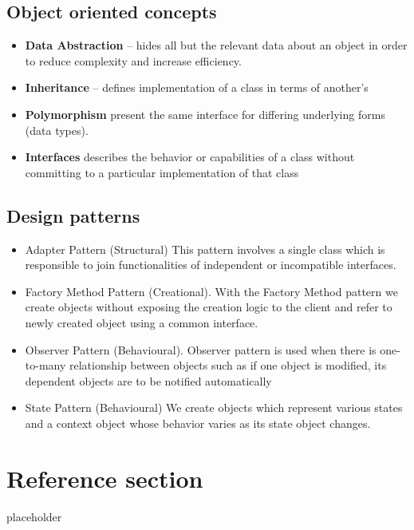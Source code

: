 \documentclass{article}
\begin{document}
\subsection{Object oriented concepts}
\begin{itemize}
	\item \textbf{Data Abstraction} – hides all but the relevant data about an object in order to reduce complexity and increase efficiency.
	\item \textbf{Inheritance} – defines implementation of a class in terms of another's
	\item \textbf{Polymorphism} present the same interface for differing underlying forms (data types).
	\item \textbf{Interfaces} describes the behavior or capabilities of a class without committing to a particular implementation of that class
\end{itemize}

\subsection{Design patterns}
\begin{itemize}
	\item Adapter Pattern (Structural) This pattern involves a single class which is responsible to join functionalities of independent or incompatible interfaces.
	\item Factory Method Pattern (Creational). With the Factory Method pattern we create objects without exposing the creation logic to the client and refer to newly created object using a common interface.
	\item Observer Pattern (Behavioural). Observer pattern is used when there is one-to-many relationship between objects such as if one object is modified, its dependent objects are to be notified automatically
	\item State Pattern (Behavioural) We create objects which represent various states and a context object whose behavior varies as its state object changes.
\end{itemize}

\pagebreak
\section*{Reference section} \label{sec:reference}
\begin{description}
	\item[placeholder] \hfill \\
\end{description}
\end{document}
